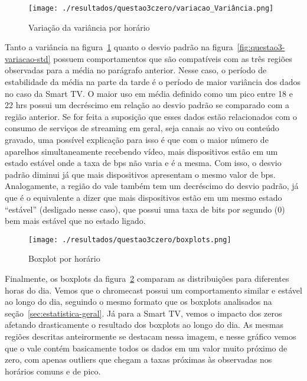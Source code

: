 \documentclass{article}
\begin{document}
\begin{figure}[h]
	\centering
	\caption{Variação da variância por horário}
	\texttt{[image: ./resultados/questao3czero/variacao\_Variância.png]}
	\label{fig:questao3-variacao-var}
\end{figure}

Tanto a variância na figura~\ref{fig:questao3-variacao-var} quanto o desvio padrão na figura~\ref{fig:questao3-variacao-std} possuem comportamentos que são compatíveis com as três regiões observadas para a média no parágrafo anterior. Nesse caso, o período de estabilidade da média na parte da tarde é o período de maior variância dos dados no caso da Smart TV. O maior uso em média definido como um pico entre 18 e 22 hrs possui um decréscimo em relação ao desvio padrão se comparado com a região anterior. Se for feita a suposição que esses dados estão relacionados com o consumo de serviços de streaming em geral, seja canais ao vivo ou conteúdo gravado, uma possível explicação para isso é que com o maior número de aparelhos simultaneamente recebendo vídeo, mais dispositivos estão em um estado estável onde a taxa de bps não varia e é a mesma. Com isso, o desvio padrão diminui já que mais dispositivos apresentam o mesmo valor de bps. Analogamente, a região do vale também tem um decréscimo do desvio padrão, já que é o equivalente a dizer que mais dispositivos estão em um mesmo estado ``estável'' (desligado nesse caso), que possui uma taxa de bits por segundo (0) bem mais estável que no estado ligado.

\begin{figure}[h]
	\centering
	\caption{Boxplot por horário}
	\texttt{[image: ./resultados/questao3czero/boxplots.png]}
	\label{fig:questao3-boxplots}
\end{figure}

Finalmente, os boxplots da figura~\ref{fig:questao3-boxplots} comparam as distribuições para diferentes horas do dia. Vemos que o chromecast possui um comportamento similar e estável ao longo do dia, seguindo o mesmo formato que os boxplots analisados na seção~\ref{sec:estatistica-geral}. Já para a Smart TV, vemos o impacto dos zeros afetando drasticamente o resultado dos boxplots ao longo do dia. As mesmas regiões descritas anteirormente se destacam nessa imagem, e nesse gráfico vemos que o vale contém basicamente todos os dados em um valor muito próximo de zero, com apenas outliers que chegam a taxas próximas às observadas nos horários comuns e de pico.
\end{document}
